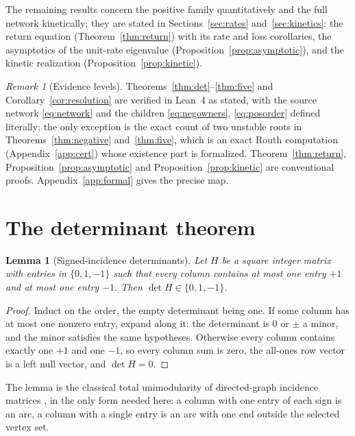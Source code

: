 \documentclass[11pt,a4paper]{article}
\theoremstyle{plain}
\newtheorem{lemma}[theorem]{Lemma}
\theoremstyle{definition}
\theoremstyle{remark}
\newtheorem{remark}[theorem]{Remark}
\begin{document}
The remaining results concern the positive family quantitatively and the full network kinetically; they are stated in Sections~\ref{sec:rates} and~\ref{sec:kinetics}: the return equation (Theorem~\ref{thm:return}) with its rate and loss corollaries, the asymptotics of the unit-rate eigenvalue (Proposition~\ref{prop:asymptotic}), and the kinetic realization (Proposition~\ref{prop:kinetic}).

\begin{remark}[Evidence levels]
Theorems~\ref{thm:det}--\ref{thm:five} and Corollary~\ref{cor:resolution} are verified in Lean~4 as stated, with the source network \eqref{eq:network} and the children \eqref{eq:negowners}, \eqref{eq:posorder} defined literally; the only exception is the exact count of two unstable roots in Theorems~\ref{thm:negative} and~\ref{thm:five}, which is an exact Routh computation (Appendix~\ref{app:cert}) whose existence part is formalized. Theorem~\ref{thm:return}, Proposition~\ref{prop:asymptotic} and Proposition~\ref{prop:kinetic} are conventional proofs. Appendix~\ref{app:formal} gives the precise map.
\end{remark}

\section{The determinant theorem}\label{sec:det}

\begin{lemma}[Signed-incidence determinants]\label{lem:incidence}
Let $H$ be a square integer matrix with entries in $\{0,1,-1\}$ such that every column contains at most one entry $+1$ and at most one entry $-1$. Then $\det H\in\{0,1,-1\}$.
\end{lemma}
\begin{proof}
Induct on the order, the empty determinant being one. If some column has at most one nonzero entry, expand along it: the determinant is $0$ or $\pm$ a minor, and the minor satisfies the same hypotheses. Otherwise every column contains exactly one $+1$ and one $-1$, so every column sum is zero, the all-ones row vector is a left null vector, and $\det H=0$.
\end{proof}

The lemma is the classical total unimodularity of directed-graph incidence matrices \citep[Chapter~19]{Schrijver1986}, in the only form needed here: a column with one entry of each sign is an arc, a column with a single entry is an arc with one end outside the selected vertex set.
\end{document}
